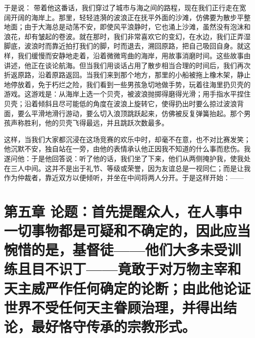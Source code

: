 于是说： 带着他这番话，我们穿过了城市与海之间的路程，现在我们正行走在宽阔开阔的海岸上。那里，轻轻涟漪的波浪正在抚平外面的沙滩，仿佛要为散步平整地面；由于大海总是动荡不安，即使风平浪静时，它也涌上沙滩，虽然没有泡沫和浪花，却有皱起的卷波。就在那时，我们非常喜欢它的变幻，在水边，我们正弄湿脚底，波浪时而靠近拍打我们的脚，时而退去，溯回原路，把自己吸回自身。就这样，我们缓慢而安静地走着，沿着微微弯曲的海岸，用故事消磨时间。这些故事由讲述，他正在谈论航海。但当我们用谈话占用了散步相当合理的时间后，我们再次折返原路，沿着原路返回。当我们来到那个地方，那里的小船被拖上橡木架，静止地停放着，免于朽烂之险，我们看到一些男孩急切地做手势，玩着往海里扔贝壳的游戏。这游戏是：从海岸上选一个贝壳，被波浪抛掷得磨得光滑；用手指水平捏住贝壳；沿着倾斜且尽可能低的角度在波浪上旋转它，使得扔出时要么掠过波浪背面，要么平滑地滑行游动，要么切入浪顶跳跃起来，仿佛被反复弹簧抬起。那个男孩声称胜利，他的贝壳飞得最远，并且跳跃次数最多。\par


这样，当我们大家都沉浸在这场竞赛的欢乐中时，却毫不在意，也不对比赛发笑；他沉默不安，独自站在一旁，由他的表情承认他正因我不知道的什么事而悲伤。我遂问他：于是他回答说：听了他的话，我们坐了下来，他们从两侧掩护我，使我处在三人中间。这并不是出于礼节、等级或荣誉，因为友谊总是一视同仁；而是让我作为仲裁者，靠近双方以便倾听，并坐在中间将两人分开。于是这样开始：——\par


\section{第五章 论题：首先提醒众人，在人事中一切事物都是可疑和不确定的，因此应当惋惜的是，基督徒——他们大多未受训练且目不识丁——竟敢于对万物主宰和天主威严作任何确定的论断；由此他论证世界不受任何天主眷顾治理，并得出结论，最好恪守传承的宗教形式。}

